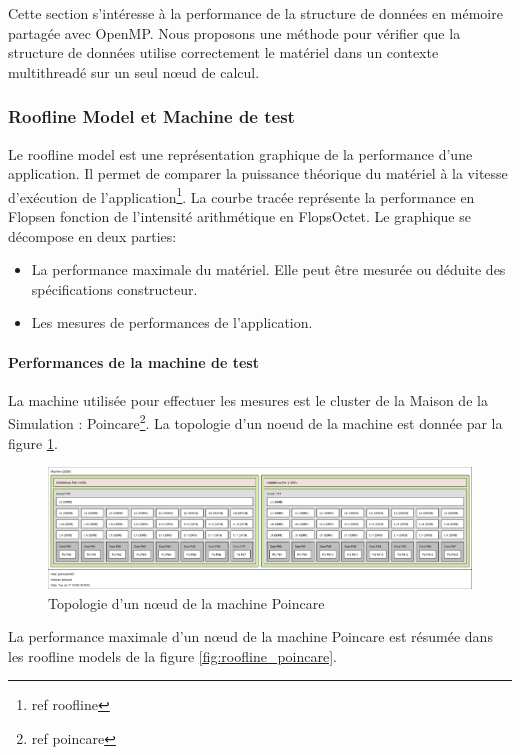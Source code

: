 Cette section s'intéresse à la performance de la structure de données en mémoire partagée avec OpenMP. Nous proposons une méthode pour vérifier que la structure de données utilise correctement le matériel dans un contexte multithreadé sur un seul nœud de calcul. 

\subsubsection{Roofline Model et Machine de test}

Le roofline model est une représentation graphique de la performance d'une application. Il permet de comparer la puissance théorique du matériel à la vitesse d'exécution de l'application\footnote{ref roofline}. La courbe tracée représente la performance en Flops\per\second en fonction de l'intensité arithmétique en Flops\per Octet. Le graphique se décompose en deux parties:
\begin{itemize}
	\item La performance maximale du matériel. Elle peut être mesurée ou déduite des spécifications constructeur.
	\item Les mesures de performances de l'application.
\end{itemize}

\paragraph{Performances de la machine de test}

La machine utilisée pour effectuer les mesures est le cluster de la Maison de la Simulation : Poincare\footnote{ref poincare}. La topologie d'un noeud de la machine est donnée par la figure \ref{fig:lstopo_poincare}.

\begin{figure}
	\centering
	\includegraphics[width=\textwidth]{img/lstopo_poincare}
	\caption{Topologie d'un nœud de la machine Poincare}
	\label{fig:lstopo_poincare}
\end{figure}

La performance maximale d'un nœud de la machine Poincare est résumée dans les roofline models de la figure \ref{fig:roofline_poincare}. 


